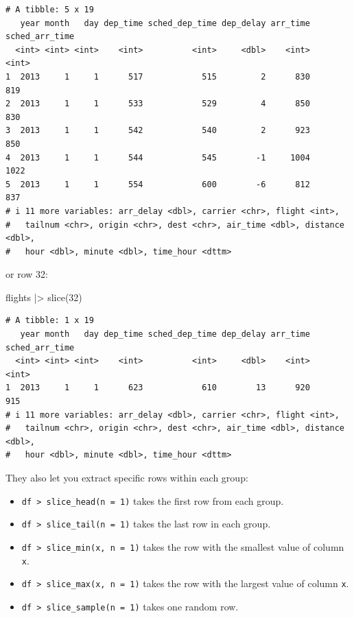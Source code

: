 \documentclass[
  letterpaper,
  DIV=11,
  numbers=noendperiod]{scrreprt}
\newenvironment{Shaded}{\begin{snugshade}}{\end{snugshade}}
\newcommand{\DecValTok}[1]{\textcolor[rgb]{0.68,0.00,0.00}{#1}}
\newcommand{\FunctionTok}[1]{\textcolor[rgb]{0.28,0.35,0.67}{#1}}
\newcommand{\NormalTok}[1]{\textcolor[rgb]{0.00,0.23,0.31}{#1}}
\newcommand{\SpecialCharTok}[1]{\textcolor[rgb]{0.37,0.37,0.37}{#1}}
\providecommand{\tightlist}{%
  \setlength{\itemsep}{0pt}\setlength{\parskip}{0pt}}
\begin{document}
\begin{verbatim}
# A tibble: 5 x 19
   year month   day dep_time sched_dep_time dep_delay arr_time sched_arr_time
  <int> <int> <int>    <int>          <int>     <dbl>    <int>          <int>
1  2013     1     1      517            515         2      830            819
2  2013     1     1      533            529         4      850            830
3  2013     1     1      542            540         2      923            850
4  2013     1     1      544            545        -1     1004           1022
5  2013     1     1      554            600        -6      812            837
# i 11 more variables: arr_delay <dbl>, carrier <chr>, flight <int>,
#   tailnum <chr>, origin <chr>, dest <chr>, air_time <dbl>, distance <dbl>,
#   hour <dbl>, minute <dbl>, time_hour <dttm>
\end{verbatim}

or row 32:

\begin{Shaded}
\begin{Highlighting}[]
\NormalTok{flights }\SpecialCharTok{|\textgreater{}}
  \FunctionTok{slice}\NormalTok{(}\DecValTok{32}\NormalTok{)}
\end{Highlighting}
\end{Shaded}

\begin{verbatim}
# A tibble: 1 x 19
   year month   day dep_time sched_dep_time dep_delay arr_time sched_arr_time
  <int> <int> <int>    <int>          <int>     <dbl>    <int>          <int>
1  2013     1     1      623            610        13      920            915
# i 11 more variables: arr_delay <dbl>, carrier <chr>, flight <int>,
#   tailnum <chr>, origin <chr>, dest <chr>, air_time <dbl>, distance <dbl>,
#   hour <dbl>, minute <dbl>, time_hour <dttm>
\end{verbatim}

They also let you extract specific rows within each group:

\begin{itemize}
\tightlist
\item
  \texttt{df\ \textbar{}\textgreater{}\ slice\_head(n\ =\ 1)} takes the
  first row from each group.
\item
  \texttt{df\ \textbar{}\textgreater{}\ slice\_tail(n\ =\ 1)} takes the
  last row in each group.
\item
  \texttt{df\ \textbar{}\textgreater{}\ slice\_min(x,\ n\ =\ 1)} takes
  the row with the smallest value of column \texttt{x}.
\item
  \texttt{df\ \textbar{}\textgreater{}\ slice\_max(x,\ n\ =\ 1)} takes
  the row with the largest value of column \texttt{x}.
\item
  \texttt{df\ \textbar{}\textgreater{}\ slice\_sample(n\ =\ 1)} takes
  one random row.
\end{itemize}
\end{document}
